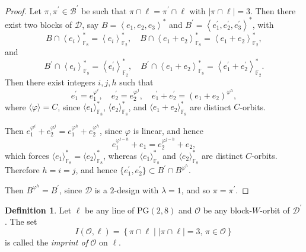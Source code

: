 \documentclass[a4paper, 11pt]{article}
\theoremstyle{definition}
\newtheorem{definition}[theorem]{Definition}
\theoremstyle{definition}
\theoremstyle{definition}
\numberwithin{equation}{section}
\begin{document}
\begin{proof}
	
	Let $\pi , \pi ^{\prime } \in \mathcal{B}^{\prime }$ be such that $\pi \cap \ell = \pi ^{\prime } \cap \ell$ with $\lvert \pi \cap \ell \rvert = 3$. Then there exist two blocks of $\mathcal{D}$, say $B = \left\langle e_{1}, e_{2}, e_{3} \right\rangle^{\ast}$ and $B^{\prime} = \left\langle e_{1}^{\prime}, e_{2}^{\prime}, e_{3}^{\prime} \right\rangle^{\ast}$, with 
	\[
	B \cap \left\langle e_{i} \right\rangle_{\mathbb{F}_{8}}^{\ast} = \left\langle e_{i} \right\rangle_{\mathbb{F}_{2}}^{\ast}, \quad 
	B \cap \left\langle e_{1} + e_{2} \right\rangle_{\mathbb{F}_{8}}^{\ast} = \left\langle e_{1} + e_{2} \right\rangle_{\mathbb{F}_{2}}^{\ast},
	\]
	and 
	\[
	B^{\prime} \cap \left\langle e_{i} \right\rangle_{\mathbb{F}_{8}}^{\ast} = \left\langle e_{i}^{\prime} \right\rangle_{\mathbb{F}_{2}}^{\ast}, \quad 
	B^{\prime} \cap \left\langle e_{1} + e_{2} \right\rangle_{\mathbb{F}_{8}}^{\ast} = \left\langle e_{1}^{\prime} + e_{2}^{\prime} \right\rangle_{\mathbb{F}_{2}}^{\ast}.
	\]
	Then there exist integers $i, j, h$ such that 
	\[
	e_{1}^{\prime} = e_{1}^{\varphi^{i}}, \quad 
	e_{2}^{\prime} = e_{2}^{\varphi^{j}}, \quad 
	e_{1}^{\prime} + e_{2}^{\prime} = (e_{1} + e_{2})^{\varphi^{h}},
	\]
	where $\langle \varphi \rangle = C$, since $\langle e_{1} \rangle_{\mathbb{F}_{8}}^{\ast}$, $\langle e_{2} \rangle_{\mathbb{F}_{8}}^{\ast}$, and $\langle e_{1} + e_{2} \rangle_{\mathbb{F}_{8}}^{\ast}$ are distinct $C$-orbits. 
	
	Then $e_{1}^{\varphi^{i}} + e_{2}^{\varphi^{j}} = e_{1}^{\varphi^{h}} + e_{2}^{\varphi^{h}}$, since $\varphi$ is linear, and hence 
	\[
	e_{1}^{\varphi^{i - h}} + e_{1} = e_{2}^{\varphi^{j - h}} + e_{2},
	\]
	which forces $\langle e_{1} \rangle_{\mathbb{F}_{8}}^{\ast} = \langle e_{2} \rangle_{\mathbb{F}_{8}}^{\ast}$, whereas $\langle e_{1} \rangle_{\mathbb{F}_{8}}^{\ast}$ and $\langle e_{2} \rangle_{\mathbb{F}_{8}}^{\ast}$ are distinct $C$-orbits. Therefore $h = i = j$, and hence $\{ e_{1}^{\prime}, e_{2}^{\prime} \} \subset B^{\prime} \cap B^{\varphi^{h}}$. 
	
	Then $B^{\varphi^{h}} = B^{\prime}$, since $\mathcal{D}$ is a $2$-design with $\lambda = 1$, and so $\pi = \pi^{\prime}$.

\end{proof}



\begin{definition}
	Let $\ell $ be any line of $\mathrm{PG}(2,8)$ and $\mathcal{O}$ be any block-$W$-orbit of $\mathcal{D}^{\prime }$. The set
	\[
	I(\mathcal{O},\ell) = \left\{ \pi \cap \ell \mid \lvert \pi \cap \ell \rvert = 3, \, \pi \in \mathcal{O} \right\}
	\] 
 	is called the \emph{imprint of }$\mathcal{O}$ on $\ell $.
\end{definition}
\end{document}
